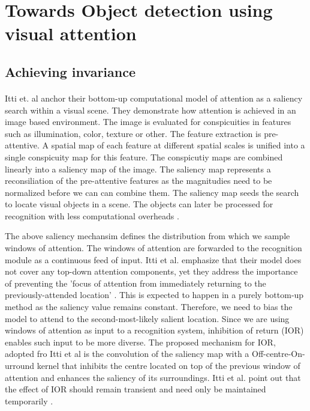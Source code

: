 \documentclass{report}
\begin{document}
\section{Towards Object detection using visual attention}

\subsection{Achieving invariance}

\paragraph{}Itti et. al anchor their bottom-up computational model of attention as a saliency search within a visual scene. They demonstrate how attention is achieved in an image based environment. The image is evaluated for conspicuities in features such as illumination, color, texture or other. The feature extraction is pre-attentive. A spatial map of each feature at different spatial scales is unified into a single conspicuity map for this feature. The conspicutiy maps are combined linearly into a saliency map of the image. The saliency map represents a reconsiliation of the pre-attentive features as the magnitudies need to be normalized before we can can combine them. The saliency map seeds the search to locate visual objects in a scene. The objects can later be processed for recognition with less computational overheads \cite{Itti2000, Itti2001}.

The above saliency mechansim defines the distribution from which we sample windows of attention. The windows of attention are forwarded to the recognition module as a continuous feed of input. Itti et al. emphasize that their model does not cover any top-down attention components, yet they address the importance of preventing the 'focus of attention from immediately returning to the previously-attended location' \cite{Itti2000}. This is expected to happen in a purely bottom-up method as the saliency value remains constant. Therefore, we need to bias the model to attend to the second-most-likely salient location. Since we are using windows of attention as input to a recognition system, inhibition of return (IOR) enables such input to be more diverse. The proposed mechanism for IOR, adopted fro Itti et al is the convolution of the saliency map with a Off-centre-On-urround kernel that inhibits the centre located on top of the previous window of attention and enhances the saliency of its surroundings. Itti et al. point out that the effect of IOR should remain transient and need only be maintained temporarily \cite{Itti2000}.
\end{document}
